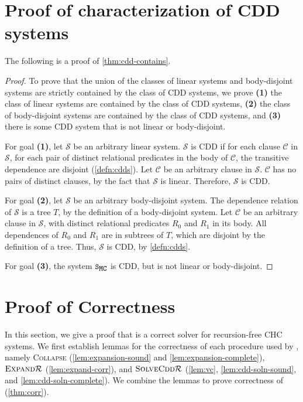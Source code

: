 \section{Proof of characterization of CDD systems}
\label{app:char}
The following is a proof of \autoref{thm:cdd-contains}.
%
\begin{proof}
  To prove that the union of the classes of linear systems and
  body-disjoint systems are strictly contained by the class of CDD
  systems, we prove %
  \textbf{(1)} the class of linear systems are contained by the class
  of CDD systems, %
  \textbf{(2)} the class of body-disjoint systems are contained by the
  class of CDD systems, and %
  \textbf{(3)} there is some CDD system that is not linear or
  body-disjoint.

  For goal \textbf{(1)}, let $\mathcal{S}$ be an arbitrary linear
  system.
  $\mathcal{S}$ is CDD if for each clause $\mathcal{C}$ in
  $\mathcal{S}$, for each pair of distinct relational predicates in
  the body of $\mathcal{C}$, the transitive dependence are disjoint
  (\autoref{defn:cdds}).
  Let $\mathcal{C}$ be an arbitrary clause in $\mathcal{S}$.
  $\mathcal{C}$ has no pairs of distinct clauses, by the fact that
  $\mathcal{S}$ is linear.
  Therefore, $\mathcal{S}$ is CDD.

  For goal \textbf{(2)}, let $\mathcal{S}$ be an arbitrary
  body-disjoint system.
  The dependence relation of $\mathcal{S}$ is a tree $T$, by the
  definition of a body-disjoint system.
  Let $\mathcal{C}$ be an arbitrary clause in $\mathcal{S}$, with
  distinct relational predicates $R_0$ and $R_1$ in its body.
  All dependences of $R_0$ and $R_1$ are in subtrees of $T$, which
  are disjoint by the definition of a tree.
  Thus, $\mathcal{S}$ is CDD, by \autoref{defn:cdds}.

  For goal \textbf{(3)}, the system $\mcchc$ is CDD, but is not linear
  or body-disjoint.
\end{proof}

\section{Proof of Correctness}
\label{app:corr}
%
In this section, we give a proof that \sys is a correct solver for
recursion-free CHC systems.
%
We first establish lemmas for the correctness of each procedure used
by \sys, namely \textsc{Collapse} (\autoref{lem:expansion-sound} and
\autoref{lem:expansion-complete}), $\textsc{Expand}{\mathcal{R}}$
(\autoref{lem:expand-corr}), and $\textsc{SolveCdd}{ \mathcal{R} }$
(\autoref{lem:vc}, \autoref{lem:cdd-soln-sound}, and
\autoref{lem:cdd-soln-complete}).
%
We combine the lemmas to prove correctness of \sys
(\autoref{thm:corr}).

